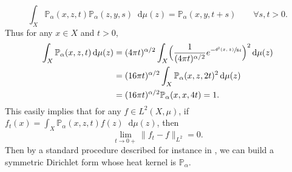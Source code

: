 \documentclass[10pt]{amsart}
\theoremstyle{plain}
\theoremstyle{definition}
\newcommand{\bP}{\mathbb{P}}
\newcommand{\di}{\mathop{}\!\mathrm{d}}
\newcommand{\dist}{\mathsf{d}}
\begin{document}
\[
\int_X \bP_\alpha(x,z,t) \bP_\alpha(z,y,s)\di\mu(z)= \bP_\alpha(x,y,t+s) \qquad \forall s,t >0.
\]
Thus for any $x \in X$ and $t>0$,
\begin{align*}
\int_X \bP_\alpha(x,z,t) \di \mu(z) & = (4 \pi t)^{\alpha/2} \int_X \Bigl(\frac{1}{(4 \pi t)^{\alpha/2}} e^{-\sfrac{\dist^2(x,z)}{8t}} \Bigr)^2 \di \mu(z)\\
& = (16 \pi t)^{\alpha/2} \int_X \bP_\alpha(x,z,2t)^2 \di \mu(z)\\ & =(16 \pi t)^{\alpha/2} \bP_\alpha(x,x,4t) = 1.
\end{align*}
This easily implies that for any $f\in L^2(X,\mu)$, if
$f_t(x)=\int_X \bP_\alpha(x,z,t)f(z) \di\mu(z)$, then
\[
\lim_{t\to 0+} \|f_t-f\|_{L^2}=0.
\]
Then by a standard procedure described for instance in \cite[\S 2]{Grigor'yan}, we can build a symmetric Dirichlet form whose heat kernel is $\bP_\alpha$.
\endproof
\end{document}
